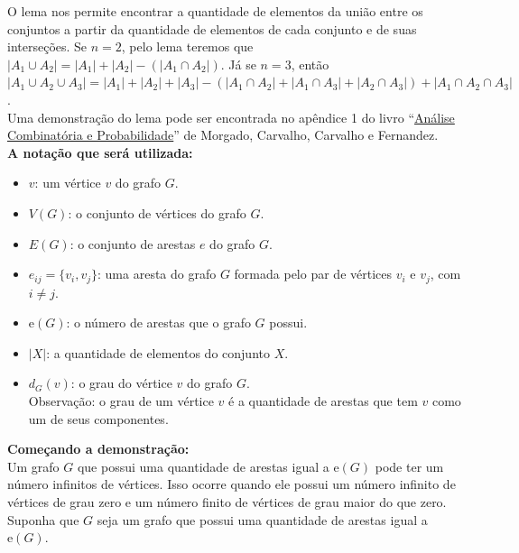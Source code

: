 \documentclass[12pt, a4paper]{article}
\theoremstyle{definition} \newtheorem{prob}{Problema}
\theoremstyle{plain} \newtheorem*{teo}{Teorema}
\begin{document}
O lema nos permite encontrar a quantidade de elementos da união entre os conjuntos a partir da quantidade de elementos de cada conjunto e de suas interseções. Se \(n = 2\), pelo lema teremos que \(|A_1 \cup A_2| = |A_1| + |A_2| - (|A_1 \cap A_2|)\). Já se \(n = 3\), então \(|A_1 \cup A_2 \cup A_3| = |A_1| + |A_2| + |A_3| - (|A_1 \cap A_2|+|A_1 \cap A_3|+|A_2 \cap A_3|)+|A_1 \cap A_2 \cap A_3|\). \\

Uma demonstração do lema pode ser encontrada no apêndice 1 do livro ``\href{https://drive.google.com/file/d/15_eYJr5kWCfwLeKdheFwPzb-UeNx_9VZ/view?usp=drive_link}{Análise Combinatória e Probabilidade}'' de Morgado, Carvalho, Carvalho e Fernandez.\\

\textbf{A notação que será utilizada:} 
 
\begin{itemize}
\item \(v\): um vértice \(v\) do grafo \(G\).

\item \(V(G)\): o conjunto de vértices do grafo \(G\).

\item \(E(G)\): o conjunto de arestas \(e\) do grafo \(G\).

\item \(e_{ij} = \{v_i, v_j\}\): uma aresta do grafo \(G\) formada pelo par de vértices \(v_i\) e \(v_j\), com \(i \neq j\).

\item \(\mathrm{e}(G)\): o número de arestas que o grafo \(G\) possui.

\item \(|X|\): a quantidade de elementos do conjunto \(X\).

\item \(d_G(v)\): o grau do vértice \(v\) do grafo \(G\). \\

Observação: o grau de um vértice \(v\) é a quantidade de arestas que tem \(v\) como um de seus componentes.
\end{itemize}

\textbf{Começando a demonstração:}\\

Um grafo \(G\) que possui uma quantidade de arestas igual a \(\mathrm{e}(G)\) pode ter um número infinitos de vértices. Isso ocorre quando ele possui um número infinito de vértices de grau zero e um número finito de vértices de grau maior do que zero. Suponha que \(G\) seja um grafo que possui uma quantidade de arestas igual a \(\mathrm{e}(G)\). \\
\end{document}
